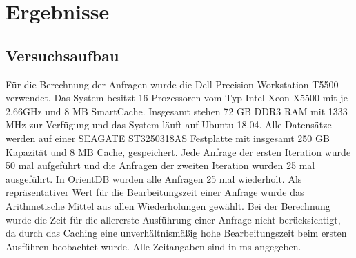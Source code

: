 
\chapter{Ergebnisse} %

\label{Kaptiel4} %

\section{Versuchsaufbau}
Für die Berechnung der Anfragen wurde die Dell Precision Workstation T5500 verwendet. Das System besitzt 16 Prozessoren vom Typ Intel Xeon  X5500 mit je 2,66GHz und  8 MB SmartCache. Insgesamt stehen 72 GB DDR3 RAM mit 1333 MHz zur Verfügung und das System läuft auf Ubuntu 18.04. Alle Datensätze werden auf einer SEAGATE ST3250318AS Festplatte mit insgesamt 250 GB Kapazität und 8 MB Cache, gespeichert.\newline
 Jede Anfrage der ersten Iteration wurde 50 mal aufgeführt und die Anfragen der zweiten Iteration wurden 25 mal ausgeführt. In OrientDB wurden alle Anfragen 25 mal wiederholt. Als repräsentativer Wert für die Bearbeitungszeit einer Anfrage  wurde das Arithmetische Mittel aus allen Wiederholungen gewählt. Bei der Berechnung wurde die Zeit für die allererste Ausführung einer Anfrage nicht berücksichtigt, da durch das Caching eine unverhältnismäßig hohe Bearbeitungszeit beim ersten Ausführen beobachtet wurde. Alle Zeitangaben sind in ms angegeben. 
